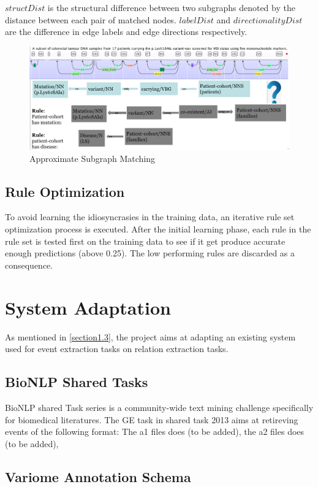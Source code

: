 $structDist$ is the structural difference between two subgraphs denoted by the distance between each pair of matched nodes. $labelDist$ and $directionalityDist$ are the difference in edge labels and edge directions respectively\cite{liu2013approximate}.
\begin{figure}
	\centering
	\includegraphics[width=\textwidth]{ASM}
	\caption{Approximate Subgraph Matching}
	\label{fig:ASM}   
\end{figure}
\subsection{Rule Optimization}
To avoid learning the idiosyncrasies in the training data, an iterative rule set optimization process is executed. After the initial learning phase, each rule in the rule set is tested first on the training data to see if it get produce accurate enough predictions (above 0.25). The low performing rules are discarded as a consequence.   
\section{System Adaptation}
As mentioned in \ref{section1.3}, the project aims at adapting an existing system used for event extraction tasks on relation extraction tasks.
\subsection{BioNLP Shared Tasks}
BioNLP shared Task series is a community-wide text mining challenge specifically for biomedical literatures. The GE task in shared task 2013 aims at retireving events of the following format:
The a1 files does (to be added), the a2 files does (to be added), 

\subsection{Variome Annotation Schema}


